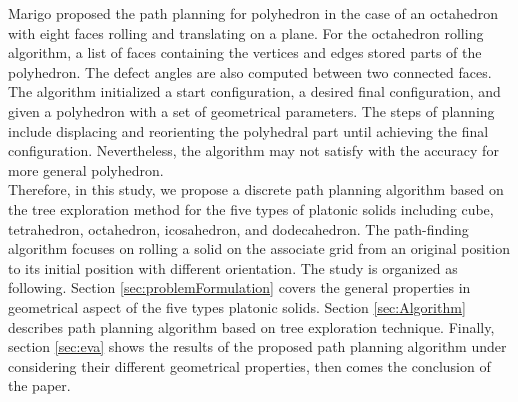 \noindent Marigo \cite{Marigo00_PlanningMotion_Polyhedra_Rolling} proposed the path planning for polyhedron in the case of an octahedron with eight faces rolling and translating on a plane. 
For the octahedron rolling algorithm, a list of faces containing the vertices and edges stored parts of the polyhedron. 
The defect angles are also computed between two connected faces.
The algorithm initialized a start configuration, a desired final configuration, and given a polyhedron with a set of geometrical parameters. 
The steps of planning include displacing and reorienting the polyhedral part until achieving the final configuration. 
Nevertheless, the algorithm may not satisfy with the accuracy for more general polyhedron.\\

\noindent Therefore, in this study, we propose a discrete path planning algorithm based on the tree exploration method for the five types of platonic solids including cube, tetrahedron, octahedron, icosahedron, and dodecahedron. The path-finding algorithm focuses on rolling a solid on the associate grid from an original position to its initial position with different orientation. 
%
The study is organized as following. Section \ref{sec:problemFormulation} covers the general properties in geometrical aspect of the five types platonic solids. Section \ref{sec:Algorithm} describes path planning algorithm based on tree exploration technique. Finally, section \ref{sec:eva} shows the results of the proposed path planning algorithm under considering their different geometrical properties, then comes the conclusion of the paper.

